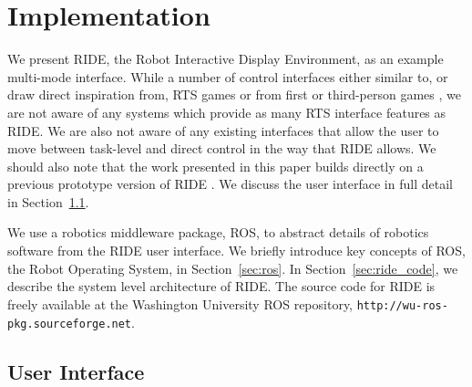 \chapter{Implementation}

We present RIDE, the Robot Interactive Display Environment, as an example multi-mode interface. While a number of control interfaces either similar to, or draw direct inspiration from, RTS games \cite{Bruemmer05turnoff} \cite{Kadous} \cite{Mclurkin} \cite{Tejada} or from first or third-person games \cite{Bruemmer05turnoff} \cite{Humphrey} \cite{Maxwell}, we are not aware of any systems which provide as many RTS interface features as RIDE. We are also not aware of any existing interfaces that allow the user to move between task-level and direct control in the way that RIDE allows. We should also note that the work presented in this paper builds directly on a previous prototype version of RIDE \cite{rrsd08}. We discuss the user interface in full detail in Section~\ref{sec:ride_user_interface}.

We use a robotics middleware package, ROS, to abstract details of robotics software from the RIDE user interface. We briefly introduce key concepts of ROS, the Robot Operating System, in Section~\ref{sec:ros}. In Section~\ref{sec:ride_code}, we describe the system level architecture of RIDE. The source code for RIDE is freely available at the Washington University ROS repository, \verb!http://wu-ros-pkg.sourceforge.net!.





\section{User Interface}
\label{sec:ride_user_interface}

